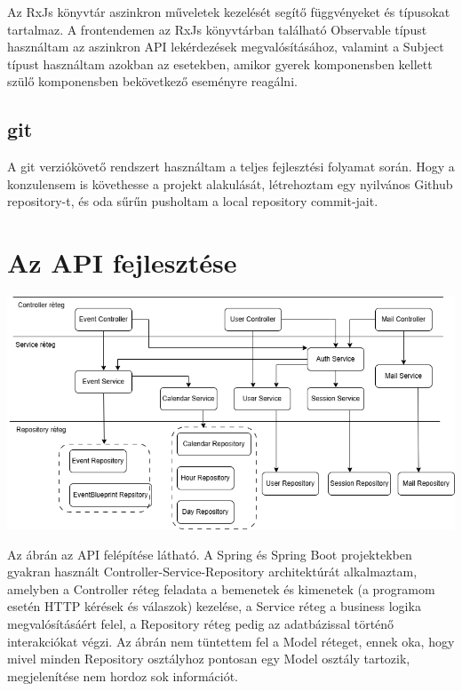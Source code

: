 \documentclass[a4paper,12pt]{report}
\theoremstyle{definition}
\theoremstyle{remark}
\begin{document}
Az RxJs\cite{Rxjswebsite} könyvtár aszinkron műveletek kezelését segítő függvényeket és típusokat tartalmaz. A frontendemen az RxJs könyvtárban található Observable típust használtam az aszinkron API lekérdezések megvalósításához, valamint a Subject típust használtam azokban az esetekben, amikor gyerek komponensben kellett szülő komponensben bekövetkező eseményre reagálni.

\section{git}

A git\cite{Gitwebsite} verziókövető rendszert használtam a teljes fejlesztési folyamat során. Hogy a konzulensem is követhesse a projekt alakulását, létrehoztam egy nyilvános Github\cite{GitHubwebsite} repository-t, és oda sűrűn pusholtam a local repository commit-jait.


\chapter{Az API fejlesztése}

\begin{center}
\includegraphics[width=150mm]{layers_backend}
\captionsetup{width=0.8\linewidth}
\end{center}

Az ábrán az API felépítése látható. A Spring és Spring Boot projektekben gyakran használt Controller-Service-Repository architektúrát alkalmaztam, amelyben a Controller réteg feladata a bemenetek és kimenetek (a programom esetén HTTP kérések és válaszok) kezelése, a Service réteg a business logika megvalósításáért felel, a Repository réteg pedig az adatbázissal történő interakciókat végzi. Az ábrán nem tüntettem fel a Model réteget, ennek oka, hogy mivel minden Repository osztályhoz pontosan egy Model osztály tartozik, megjelenítése nem hordoz sok információt.
\end{document}
